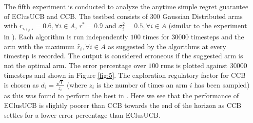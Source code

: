	
	The fifth experiment is conducted to analyze the anytime simple regret guarantee of EClusUCB and CCB. The testbed consists of $300$ Gaussian Distributed arms with $r_{i_{:{{i}\neq {*}}}}=0.6,\forall i\in A$, $r^{*}=0.9$ and $\sigma_{i}^{2}=0.5,\forall i\in A$ (similar to the experiment in \citet{liu2016modification}). Each algorithm is run independently $100$ times for $30000$ timesteps and the arm with the maximum $\hat{r}_i,\forall i\in A$ as suggested by the algorithms at every timestep is recorded. The output is considered erroneous if the suggested arm is not the optimal arm. The error percentage over $100$ runs is plotted against $30000$ timesteps and shown in Figure \ref{fig:5}. The exploration regulatory factor for CCB is chosen as $d_i=\frac{\sqrt{T}}{z_{i}}$ (where $z_{i}$ is the number of times an arm ${i}$ has been sampled) as this was found to perform the best in \citet{liu2016modification}. Here we see that the performance of EClusUCB is slightly poorer than CCB towards the end of the horizon as CCB settles for a lower error percentage than EClusUCB.

